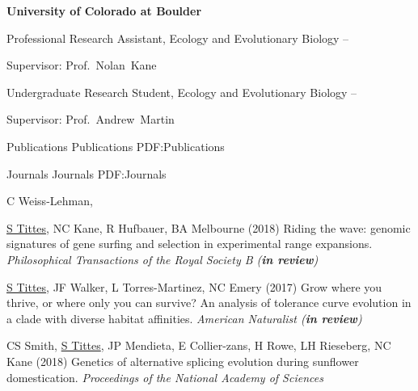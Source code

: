 \documentclass[letterpaper,MMMyyyy,nonstopmode]{simpleresumecv}
\begin{document}
\begin{Body}
\Entry
{\textbf{University of Colorado at Boulder}}

\Gap
\BulletItem
Professional Research Assistant, Ecology and Evolutionary Biology
\hfill
{} --
\begin{Detail}
\SubBulletItem
Supervisor:
Prof.~Nolan~Kane
\end{Detail}

\Entry

\Gap
\BulletItem
Undergraduate Research Student, Ecology and Evolutionary Biology
\hfill
{} --
\begin{Detail}
\SubBulletItem
Supervisor:
Prof.~Andrew~Martin
\end{Detail}


\Section
{Publications}
{Publications}
{PDF:Publications}

\SubSection
{Journals}
{Journals}
{PDF:Journals}

\begingroup
\renewcommand{\MaxNumberedItem}{[200]}



\Gap
\NumberedItem{[9]}
C Weiss-Lehman, {\underline{S Tittes}, NC Kane, R Hufbauer, BA Melbourne
(2018)
Riding the wave: genomic signatures of gene surfing and selection in experimental range expansions.
\textit{Philosophical Transactions of the Royal Society B (\textbf{in review})}

\Gap
\NumberedItem{[7]}
{\underline{S Tittes}, JF Walker, L Torres-Martinez, NC Emery
(2017)
Grow where you thrive, or where only you can survive? An analysis of tolerance curve evolution in a clade with diverse habitat affinities.
\textit{American Naturalist (\textbf{in review})}}



\Gap
\NumberedItem{[8]}
CS Smith, {\underline{S Tittes}, JP Mendieta, E Collier-zans, H Rowe, LH  Rieseberg, NC Kane 
(2018)
Genetics of alternative splicing evolution during sunflower domestication.
\textit{Proceedings of the National Academy of Sciences}}


}
\end{Body}
\end{document}
